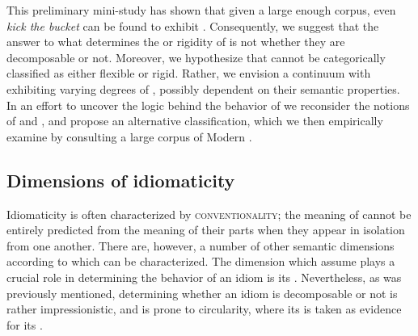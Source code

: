 \documentclass[output=paper]{langsci/langscibook}
\begin{document}
\eal
\zl

This preliminary mini-study has shown that given a large enough corpus, even \textit{kick the bucket} can be found to exhibit . Consequently, we suggest that the answer to what determines the  or rigidity of  is not whether they are decomposable or not. Moreover, we hypothesize that  cannot be categorically classified as either flexible or rigid. Rather, we envision a continuum with  exhibiting varying degrees of , possibly dependent on their semantic properties.
In an effort to uncover the logic behind the behavior of  we reconsider the notions of  and , and propose an alternative classification, which we then empirically examine by consulting a large corpus of Modern .


\subsection{Dimensions of idiomaticity}
\label{she:sec:semantic-class}
Idiomaticity is often characterized by {\scshape conventionality}; the meaning of  cannot be entirely predicted from the meaning of their parts when they appear in isolation from one another. There are, however, a number of other semantic dimensions according to which  can be characterized. The dimension which \citet[498]{nunberg94} assume plays a crucial role in determining the behavior of an idiom is its . Nevertheless, as was previously mentioned, determining whether an idiom is decomposable or not is rather impressionistic, and is prone to circularity, where its  is taken as evidence for its .
\end{document}
